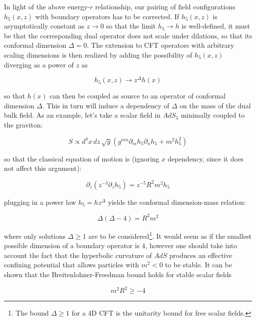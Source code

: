 In light of the above energy-$r$ relationship, our pairing of field configurations $h_5(x,z)$ with boundary operators has to be corrected. If $h_5(x,z)$ is asymptotically constant as $z\rightarrow 0$ so that the limit $h_5 \rightarrow h$ is well-defined, it must be that the corresponding dual operator does not scale under dilations, so that its conformal dimension $\Delta = 0$. The extension to CFT operators with arbitrary scaling dimensions is then realized by adding the possibility of $h_5(x,z)$ diverging as a power of $z$ as

\begin{equation}
	h_5(x,z) \rightarrow z^\Delta h(x)
	\label{}
\end{equation}

so that $h(x)$ can then be coupled as source to an operator of conformal dimension $\Delta$. This in turn will induce a dependency of $\Delta$ on the mass of the dual bulk field. As an example, let's take a scalar field in $AdS_5$ minimally coupled to the graviton:

\begin{equation}
	S \propto d^4 x\, dz \, \sqrt g \left( g^{mn} \partial_m h_5 \partial_n h_5 + m^2 h_5^2 \right)
	\label{}
\end{equation}

so that the classical equation of motion is (ignoring $x$ dependency, since it does not affect this argument):

\begin{equation}
	\partial_z \left( z^{-3} \partial_z h_5 \right) = z^{-5} R^2 m^2 h_5
	\label{ }
\end{equation}

plugging in a power law $h_5 = h z^\Delta$ yields the conformal dimension-mass relation:

\begin{equation}
	\Delta (\Delta-4) = R^2 m^2
	\label{}
\end{equation}

where only solutions $\Delta \geq 1$ are to be considered\footnote{The bound $\Delta \geq 1$ for a 4D CFT is the unitarity bound for free scalar fields.}. It would seem as if the smallest possible dimension of a boundary operator is $4$, however one should take into account the fact that the hyperbolic curvature of $AdS$ produces an effective confining potential that allows particles with $m^2 < 0$ to be stable. It can be shown that the Breitenlohner-Freedman bound holds for stable scalar fields

\begin{equation}
	m^2 R^2 \geq - 4
	\label{}
\end{equation}

